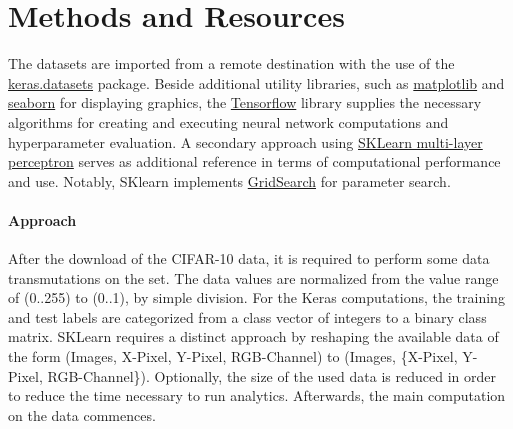 \chapter{Methods and Resources}
The datasets are imported from a remote destination with the use of the \href{https://keras.io/api/datasets/cifar10/}{keras.datasets} package.
Beside additional utility libraries, such as \href{https://matplotlib.org/}{matplotlib} and \href{https://seaborn.pydata.org/}{seaborn} for displaying graphics, the \href{https://www.tensorflow.org/}{Tensorflow} library supplies the necessary algorithms for creating and executing neural network computations and hyperparameter evaluation.
A secondary approach using \href{https://scikit-learn.org/stable/modules/generated/sklearn.neural_network.MLPClassifier.html}{SKLearn multi-layer perceptron} serves as additional reference in terms of computational performance and use. Notably, SKlearn implements \href{https://scikit-learn.org/stable/modules/generated/sklearn.model_selection.GridSearchCV.html}{GridSearch} for parameter search.

\subsubsection{Approach}
After the download of the CIFAR-10 data, it is required to perform some data transmutations on the set.
The data values are normalized from the value range of (0..255) to (0..1), by simple division. 
For the Keras computations, the training and test labels are categorized from a class vector of integers to a binary class matrix.
SKLearn requires a distinct approach by reshaping the available data of the form (Images, X-Pixel, Y-Pixel, RGB-Channel) to (Images, \{X-Pixel, Y-Pixel, RGB-Channel\}).
Optionally, the size of the used data is reduced in order to reduce the time necessary to run analytics.
Afterwards, the main computation on the data commences.
